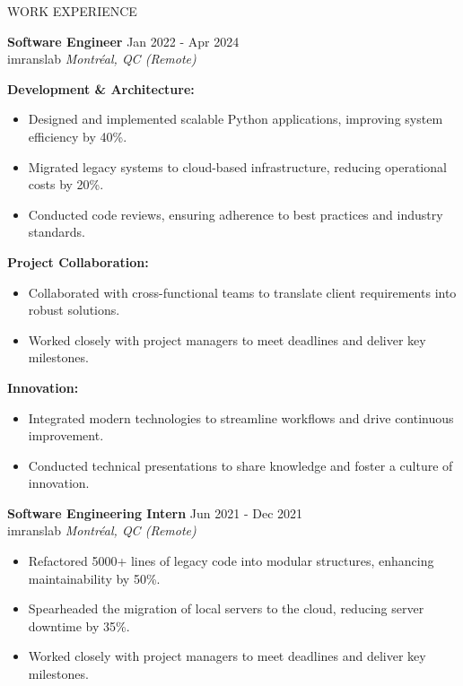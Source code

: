 \documentclass{resume} %
\begin{document}
\begin{rSection}{WORK EXPERIENCE}

\textbf{Software Engineer} \hfill Jan 2022 - Apr 2024\\
imranslab \hfill \textit{Montréal, QC (Remote)}

\textbf{Development \& Architecture:}
 \begin{itemize}
    \item Designed and implemented scalable Python applications, improving system efficiency by 40\%.
    \item Migrated legacy systems to cloud-based infrastructure, reducing operational costs by 20\%.
    \item Conducted code reviews, ensuring adherence to best practices and industry standards.
 \end{itemize}

\textbf{Project Collaboration:}
 \begin{itemize}
    \item Collaborated with cross-functional teams to translate client requirements into robust solutions.
    \item Worked closely with project managers to meet deadlines and deliver key milestones.
 \end{itemize}

\textbf{Innovation:}
 \begin{itemize}
    \item Integrated modern technologies to streamline workflows and drive continuous improvement.
    \item Conducted technical presentations to share knowledge and foster a culture of innovation.
 \end{itemize}

\textbf{Software Engineering Intern} \hfill Jun 2021 - Dec 2021\\
imranslab \hfill \textit{Montréal, QC (Remote)}

\begin{itemize}
    \item Refactored 5000+ lines of legacy code into modular structures, enhancing maintainability by 50\%.
    \item Spearheaded the migration of local servers to the cloud, reducing server downtime by 35\%.
    \item Worked closely with project managers to meet deadlines and deliver key milestones.
\end{itemize}

\end{rSection} 
\end{document}
